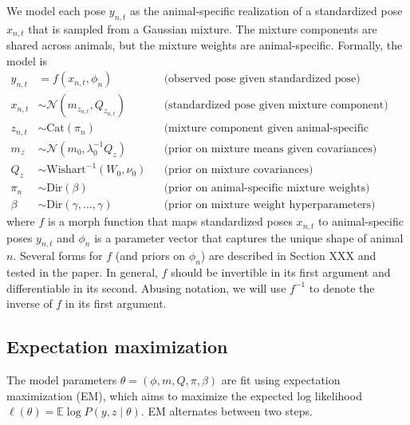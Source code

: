 \documentclass{article}         %
\newcommand{\EE}{\mathbb{E}}
\newcommand{\NN}{\mathcal{N}}
\begin{document}
We model each pose $y_{n,t}$ as the animal-specific realization of a standardized pose $x_{n,t}$ that is sampled from a Gaussian mixture. The mixture components are shared across animals, but the mixture weights are animal-specific. Formally, the model is
%
\begin{align*}
    y_{n,t} & = f(x_{n,t}, \phi_n) 
        && \text{(observed pose given standardized pose)} \\
    x_{n,t} & \sim \NN(m_{z_{n,t}}, Q_{z_{n,t}}) 
        && \text{(standardized pose given mixture component)}  \\
    z_{n,t} & \sim \text{Cat}(\pi_n)  
        && \text{(mixture component given animal-specific weights)} \\
    m_z & \sim \NN(m_0, \lambda_0^{-1} Q_z) 
        && \text{(prior on mixture means given covariances)} \\
    Q_z & \sim \text{Wishart}^{-1}(W_0, \nu_0) 
        && \text{(prior on mixture covariances)} \\
    \pi_n & \sim \text{Dir}(\beta)
        && \text{(prior on animal-specific mixture weights)} \\
    \beta & \sim \text{Dir}(\gamma,\dots,\gamma)
        && \text{(prior on mixture weight hyperparameters)}
\end{align*}   
%
where $f$ is a morph function that maps standardized poses $x_{n,t}$ to animal-specific poses $y_{n,t}$ and $\phi_n$ is a parameter vector that captures the unique shape of animal $n$. Several forms for $f$ (and priors on $\phi_n$) are described in Section XXX and tested in the paper. In general, $f$ should be invertible in its first argument and differentiable in its second. Abusing notation, we will use $f^{-1}$ to denote the inverse of $f$ in its first argument.



\subsection{Expectation maximization}
\label{sec:em-general}

The model parameters $\theta = (\phi, m, Q, \pi, \beta)$ are fit using expectation maximization (EM), which aims to maximize the expected log likelihood $\ell(\theta) = \EE \log P(y, z \mid \theta)$. EM alternates between two steps.


\end{document}
